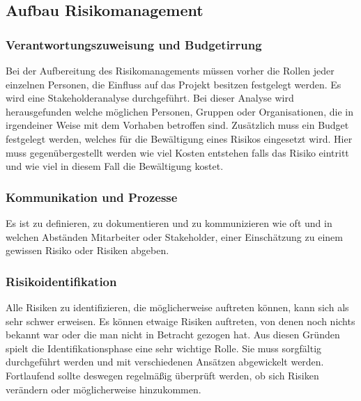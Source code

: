 \subsection{Aufbau Risikomanagement}
\subsubsection{Verantwortungszuweisung und Budgetirrung}
Bei der Aufbereitung des Risikomanagements müssen vorher die Rollen jeder einzelnen Personen, die Einfluss auf das Projekt besitzen festgelegt werden. Es wird eine Stakeholderanalyse durchgeführt. Bei dieser Analyse wird herausgefunden welche möglichen Personen, Gruppen oder Organisationen, die in irgendeiner Weise mit dem Vorhaben betroffen sind.
Zusätzlich muss ein Budget festgelegt werden, welches für die Bewältigung eines Risikos eingesetzt wird. Hier muss gegenübergestellt werden wie viel Kosten entstehen falls das Risiko eintritt und wie viel in diesem Fall die Bewältigung kostet.


\subsubsection{Kommunikation und Prozesse}
Es ist zu definieren, zu dokumentieren und zu kommunizieren wie oft und in welchen Abständen Mitarbeiter oder Stakeholder, einer Einschätzung zu einem gewissen Risiko oder Risiken abgeben. 

\subsubsection{Risikoidentifikation}
Alle Risiken zu identifizieren, die möglicherweise auftreten können, kann sich als sehr schwer erweisen. Es können etwaige Risiken auftreten, von denen noch nichts bekannt war oder die man nicht in Betracht gezogen hat. Aus diesen Gründen spielt die Identifikationsphase eine sehr wichtige Rolle. Sie muss sorgfältig durchgeführt werden und mit verschiedenen Ansätzen abgewickelt werden. Fortlaufend sollte deswegen regelmäßig überprüft werden, ob sich Risiken verändern oder möglicherweise hinzukommen.
\\

